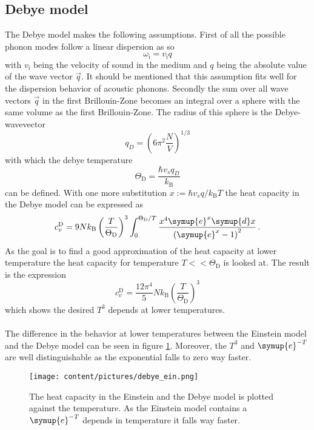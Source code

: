 \subsection{Debye model}
The Debye model makes the following assumptions.
First of all the possible phonon modes follow a linear dispersion as so 
\begin{equation*}
    \omega_\text{i} = v_\text{i} q
\end{equation*}
with $v_\text{i}$ being the velocity of sound in the medium and $q$ being the absolute value of the wave vector $\vec{q}$.
It should be mentioned that this assumption fits well for the dispersion behavior of acoustic phonons.
Secondly the sum over all wave vectors $\vec{q}$ in the first Brillouin-Zone becomes an integral over a sphere with the same volume as the first Brillouin-Zone.
The radius of this sphere is the Debye-wavevector 
\begin{equation*}
    q_D = \left ( 6 \pi^2 \frac{N}{V} \right )^{1/3}
\end{equation*}
with which the debye temperature
\begin{equation*}
    \Theta_\text{D} = \frac{\hbar v_s q_{D}}{k_\text{B}}
\end{equation*}
can be defined.
With one more substitution $x :=  \hbar v_s q / k_\text{B}T$ the heat capacity in the Debye model can be expressed as
\begin{equation*}
    c_v ^{\text{D}} = 9 N k_\text{B} \left (\frac{T}{\Theta_\text{D}} \right )^3 \int_0^{\Theta_\text{D}/T} \frac{x^4 \symup{e}^x \symup{d}x}{\left( \symup{e}^x - 1\right)^2} \, .
    \label{eq:heat_debye}
\end{equation*}
As the goal is to find a good approximation of the heat capacity at lower temperature the heat capacity for temperature $T<<\Theta_\text{D}$ is looked at.
The result is the expression
\begin{equation*}
    c_v ^{\text{D}} = \frac{12 \pi^4}{5} N k_\text{B} \left ( \frac{T}{\Theta_\text{D}} \right )^3
\end{equation*}
which shows the desired $T^3$ depends at lower temperatures.\\\\
The difference in the behavior at lower temperatures between the Einstein model and the Debye model can be seen in figure \ref{fig:ein_deb}.
Moreover, the $T^3$ and $\symup{e}^{-T}$ are well distinguishable as the exponential falls to zero way faster.
\begin{figure}
    \centering
    \texttt{[image: content/pictures/debye\_ein.png]}
    \caption{The heat capacity in the Einstein and the Debye model is plotted against the temperature. As the Einstein model contains a $\symup{e}^{-T}$ depends in temperature it falls way faster.}
    \label{fig:ein_deb}
\end{figure}